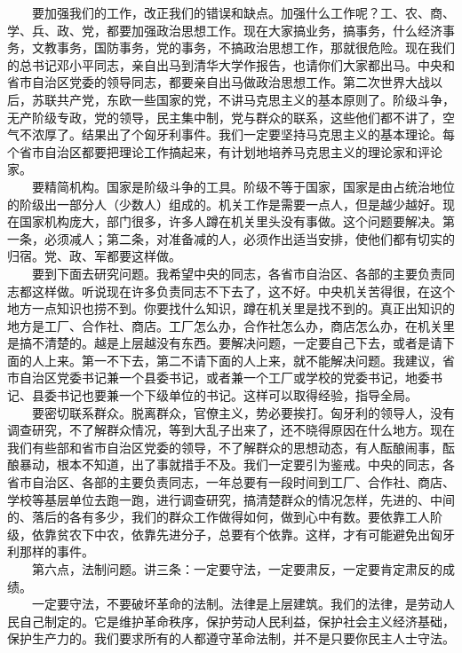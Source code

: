 \documentclass[cn,11pt,chinese]{elegantbook}
\begin{document}
　　要加强我们的工作，改正我们的错误和缺点。加强什么工作呢？工、农、商、学、兵、政、党，都要加强政治思想工作。现在大家搞业务，搞事务，什么经济事务，文教事务，国防事务，党的事务，不搞政治思想工作，那就很危险。现在我们的总书记邓小平同志，亲自出马到清华大学作报告，也请你们大家都出马。中央和省市自治区党委的领导同志，都要亲自出马做政治思想工作。第二次世界大战以后，苏联共产党，东欧一些国家的党，不讲马克思主义的基本原则了。阶级斗争，无产阶级专政，党的领导，民主集中制，党与群众的联系，这些他们都不讲了，空气不浓厚了。结果出了个匈牙利事件。我们一定要坚持马克思主义的基本理论。每个省市自治区都要把理论工作搞起来，有计划地培养马克思主义的理论家和评论家。\\
　　要精简机构。国家是阶级斗争的工具。阶级不等于国家，国家是由占统治地位的阶级出一部分人（少数人）组成的。机关工作是需要一点人，但是越少越好。现在国家机构庞大，部门很多，许多人蹲在机关里头没有事做。这个问题要解决。第一条，必须减人；第二条，对准备减的人，必须作出适当安排，使他们都有切实的归宿。党、政、军都要这样做。\\
　　要到下面去研究问题。我希望中央的同志，各省市自治区、各部的主要负责同志都这样做。听说现在许多负责同志不下去了，这不好。中央机关苦得很，在这个地方一点知识也捞不到。你要找什么知识，蹲在机关里是找不到的。真正出知识的地方是工厂、合作社、商店。工厂怎么办，合作社怎么办，商店怎么办，在机关里是搞不清楚的。越是上层越没有东西。要解决问题，一定要自己下去，或者是请下面的人上来。第一不下去，第二不请下面的人上来，就不能解决问题。我建议，省市自治区党委书记兼一个县委书记，或者兼一个工厂或学校的党委书记，地委书记、县委书记也要兼一个下级单位的书记。这样可以取得经验，指导全局。\\
　　要密切联系群众。脱离群众，官僚主义，势必要挨打。匈牙利的领导人，没有调查研究，不了解群众情况，等到大乱子出来了，还不晓得原因在什么地方。现在我们有些部和省市自治区党委的领导，不了解群众的思想动态，有人酝酿闹事，酝酿暴动，根本不知道，出了事就措手不及。我们一定要引为鉴戒。中央的同志，各省市自治区、各部的主要负责同志，一年总要有一段时间到工厂、合作社、商店、学校等基层单位去跑一跑，进行调查研究，搞清楚群众的情况怎样，先进的、中间的、落后的各有多少，我们的群众工作做得如何，做到心中有数。要依靠工人阶级，依靠贫农下中农，依靠先进分子，总要有个依靠。这样，才有可能避免出匈牙利那样的事件。\\
　　第六点，法制问题。讲三条：一定要守法，一定要肃反，一定要肯定肃反的成绩。\\
　　一定要守法，不要破坏革命的法制。法律是上层建筑。我们的法律，是劳动人民自己制定的。它是维护革命秩序，保护劳动人民利益，保护社会主义经济基础，保护生产力的。我们要求所有的人都遵守革命法制，并不是只要你民主人士守法。\\
\end{document}
